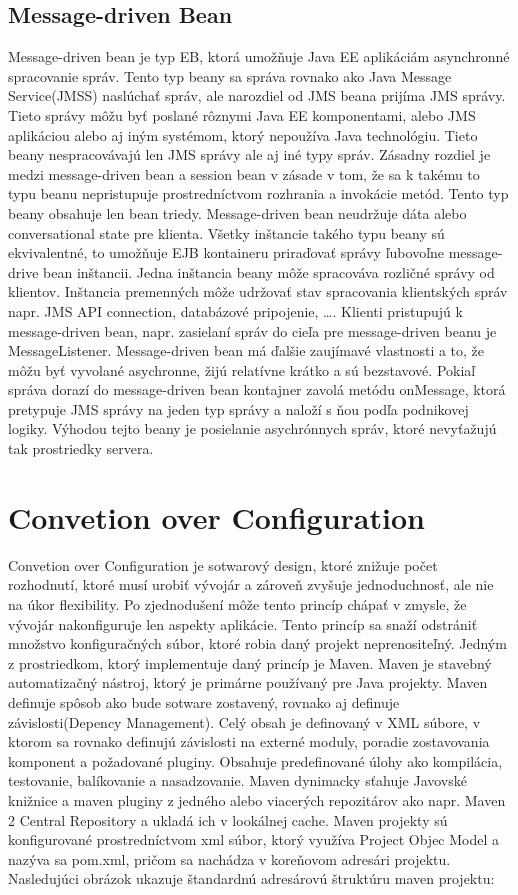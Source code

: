 \subsection{Message-driven Bean}
Message-driven bean je typ EB, ktorá umožňuje Java EE aplikáciám asynchronné spracovanie správ. Tento typ beany sa správa rovnako ako Java Message Service(JMSS)\cite{messagebook} naslúchať správ, ale narozdiel od JMS beana prijíma JMS správy. Tieto správy môžu byť poslané rôznymi Java EE komponentami, alebo JMS aplikáciou alebo aj iným systémom, ktorý nepoužíva Java technológiu. Tieto beany nespracovávajú len JMS správy ale aj iné typy správ. Zásadny rozdiel je medzi message-driven bean a session bean v zásade v tom, že sa k takému to typu beanu nepristupuje prostredníctvom rozhrania a invokácie metód. Tento typ beany obsahuje len bean triedy. Message-driven bean neudržuje dáta alebo conversational state pre klienta. Všetky inštancie takého typu beany sú ekvivalentné, to umožňuje EJB kontaineru priraďovať správy ľubovoľne message-drive bean inštancii. Jedna inštancia beany môže spracováva rozličné správy od klientov. Inštancia premenných môže udržovať stav spracovania klientských správ napr. JMS API connection, databázové pripojenie, \ldots. Klienti pristupujú k message-driven bean, napr. zasielaní správ do cieľa pre message-driven beanu je MessageListener. Message-driven bean má ďalšie zaujímavé vlastnosti a to, že môžu byť vyvolané asychronne, žijú relatívne krátko a sú bezstavové. Pokiaľ správa dorazí do message-driven bean kontajner zavolá metódu onMessage, ktorá pretypuje JMS správy na jeden typ správy a naloží s ňou podľa podnikovej logiky.  Výhodou tejto beany je posielanie asychrónnych správ, ktoré nevyťažujú tak prostriedky servera.



\section{Convetion over Configuration}
Convetion over Configuration je sotwarový design, ktoré znižuje počet rozhodnutí, ktoré musí urobiť vývojár a zároveň zvyšuje jednoduchnosť, ale nie na úkor flexibility. Po zjednodušení môže tento princíp chápať v zmysle, že vývojár nakonfiguruje len  aspekty aplikácie. Tento princíp sa snaží odstrániť množstvo konfiguračných súbor, ktoré robia daný projekt neprenositeľný.
Jedným z prostriedkom, ktorý implementuje daný princíp je Maven. Maven je stavebný automatizačný nástroj, ktorý je primárne používaný pre Java projekty. Maven definuje spôsob ako bude sotware zostavený, rovnako aj definuje závislosti(Depency Management). Celý obsah je definovaný v XML súbore, v ktorom sa rovnako definujú závislosti na externé moduly, poradie zostavovania komponent a požadované pluginy. Obsahuje predefinované úlohy ako kompilácia, testovanie, balíkovanie a nasadzovanie. Maven dynimacky sťahuje Javovské knižnice a maven pluginy z jedného alebo viacerých repozitárov ako napr. Maven 2 Central Repository a ukladá ich v lookálnej cache. Maven projekty sú konfigurované prostredníctvom xml súbor, ktorý využíva Project Objec Model a nazýva sa pom.xml, pričom sa nachádza v koreňovom adresári projektu. Nasledujúci obrázok ukazuje štandardnú adresárovú štruktúru maven projektu:

